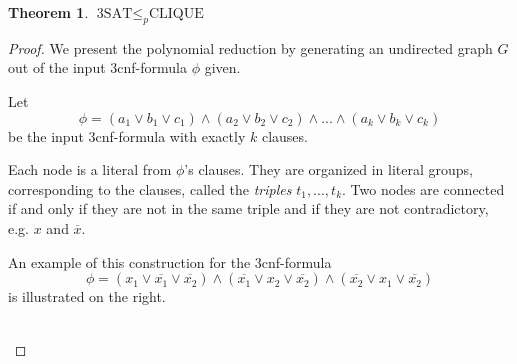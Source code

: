 \documentclass[10pt,fleqn]{article}
\theoremstyle{definition}
\newtheorem{theorem}{Theorem}
\theoremstyle{remark}
\newcommand{\cliqueprob}{\text{CLIQUE}}
\newcommand{\threesatprob}{\text{3SAT}}
\begin{document}
\begin{theorem} \(\threesatprob \leq_p \cliqueprob\)
\end{theorem}

\begin{proof} We present the polynomial reduction by generating an undirected graph \(G\) out of the input 3cnf-formula \(\phi\) given.

    \begin{minipage}{0.5\linewidth}
        Let
        \[
            \phi = (a_1 \lor b_1 \lor c_1) \land (a_2 \lor b_2 \lor c_2) \land ... \land (a_k \lor b_k \lor c_k)
        \]
        be the input 3cnf-formula with exactly \(k\) clauses.

        Each node is a literal from \(\phi\)'s clauses. They are organized in literal groups, corresponding to the clauses, called the \emph{triples} \(t_1, ..., t_k\). Two nodes are connected if and only if they are not in the same triple and if they are not contradictory, e.g. \(x\) and \(\overline{x}\).

        An example of this construction for the 3cnf-formula \[\phi = (x_1 \lor \overline{x_1} \lor \overline{x_2}) \land (\overline{x_1} \lor x_2 \lor \overline{x_2}) \land (\overline{x_2} \lor x_1 \lor \overline{x_2})\] is illustrated on the right.
    \end{minipage}
    \begin{minipage}{0.5\linewidth}
        \centering
    \end{minipage}\\


\end{proof}
\end{document}
